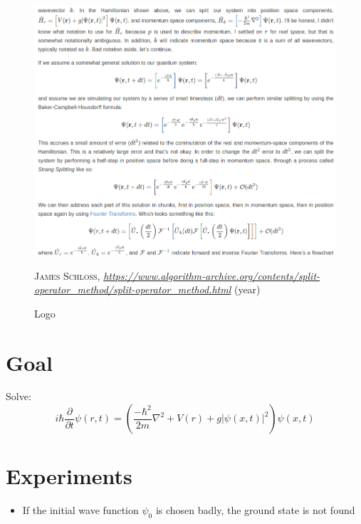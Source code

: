 \begin{figure}[H]
    \centering
    \includegraphics[width=1.0\textwidth]{IMAGE/strang_splitting.png}\\
    \caption{Logo}
    \textsc{James Schloss},
    \emph{            \url{https://www.algorithm-archive.org/contents/split-operator_method/split-operator_method.html}
    } (year)
    \label{fig:strang_splitting}
\end{figure}

\section{Goal}
Solve:
    \begin{equation}
        i \hbar \frac{\partial}{\partial t} \psi(r,t) = \left(\frac{-\hbar^{2}}{2 m} \nabla^{2} + V(r) + g |\psi(x,t)|^{2} \right) \psi(x,t)
    \end{equation}

\section{Experiments}
\begin{itemize}
    \item If the initial wave function $\psi_{0}$ is chosen badly, the ground state is not found
\end{itemize}
